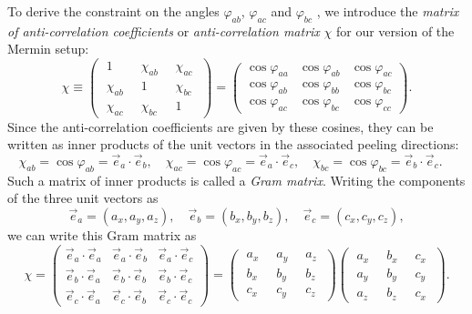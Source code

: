 To derive the constraint on the angles $\varphi_{ab}$, $\varphi_{ac}$ and $\varphi_{bc}$ , we introduce the \emph{matrix of anti-correlation coefficients} or \emph{anti-correlation matrix} $\chi$ for our version of the Mermin setup:
\begin{equation}
\chi
\equiv  
\begin{pmatrix}
\; 1 \; & \; \chi_{ab} \; & \;  \chi_{ac} \; \\[.2cm]
\; \chi_{ab} & \; 1 \; & \;  \chi_{bc} \; \\[.2cm]
 \; \chi_{ac} \; & \; \chi_{bc} \; & \;  1 
\end{pmatrix}
=
\begin{pmatrix}
\cos{\varphi_{aa}} & \cos{\varphi_{ab}} & \cos{\varphi_{ac}} \\[.2cm]
\cos{\varphi_{ab}} & \cos{\varphi_{bb}} & \cos{\varphi_{bc}} \\[.2cm]
\cos{\varphi_{ac}} & \cos{\varphi_{bc}} & \cos{\varphi_{cc}} 
\end{pmatrix}.
\label{chi matrix}
\end{equation}
Since the anti-correlation coefficients are given by these cosines, they can be written as inner products of the unit vectors in the associated peeling directions:
\begin{equation}
\chi_{ab} = \cos{\varphi_{ab}} = \vec{e}_a \cdot \vec{e}_b, \quad
\chi_{ac} = \cos{\varphi_{ac}} = \vec{e}_a \cdot \vec{e}_c, \quad
\chi_{bc} = \cos{\varphi_{bc}} = \vec{e}_b \cdot \vec{e}_c. \quad
\label{chis2angles2innerproducts}
\end{equation}
Such a matrix of inner products is called a \emph{Gram matrix}. Writing the components of the three unit vectors as
\begin{equation}
\vec{e}_a = (a_x, a_y, a_z),  \quad \vec{e}_b = (b_x, b_y, b_z), \quad \vec{e}_c = (c_x, c_y, c_z),
\label{comps of unit vectors e_abc}
\end{equation}
we can write this Gram matrix as
\begin{equation}
\chi
= 
\begin{pmatrix}
\vec{e}_a \! \cdot  \vec{e}_a &  \vec{e}_a \! \cdot  \vec{e}_b  &   \vec{e}_a \! \cdot  \vec{e}_c  \\[.2cm]
\vec{e}_b \! \cdot  \vec{e}_a & \vec{e}_b \! \cdot  \vec{e}_b & \vec{e}_b \! \cdot  \vec{e}_c \\[.2cm]
\vec{e}_c \! \cdot  \vec{e}_a & \vec{e}_c \! \cdot  \vec{e}_b  & \vec{e}_c \! \cdot  \vec{e}_c 
\end{pmatrix}
=
\begin{pmatrix}
\; a_x \; & \; a_y \; & \;  a_z \; \\[.2cm]
\; b_x \; & \; b_y \; & \;  b_z \; \\[.2cm]
 \; c_x \; & \; c_y \; & \;  c_z 
\end{pmatrix}
\begin{pmatrix}
\; a_x \; & \; b_x \; & \;  c_x \; \\[.2cm]
\; a_y \; & \; b_y \; & \;  c_y \; \\[.2cm] 
 \; a_z \; & \; b_z \; & \;  c_x 
\end{pmatrix}.
\label{QM10}
\end{equation}
